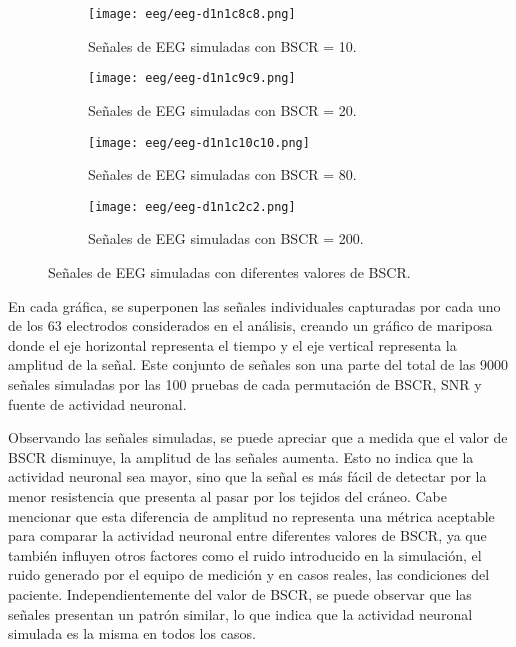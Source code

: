 \begin{figure}[tbp]
    \centering
    \begin{subfigure}{0.9\textwidth}
        \texttt{[image: eeg/eeg-d1n1c8c8.png]}
        \caption{Señales de EEG simuladas con BSCR = 10.}
        \label{fig:eeg-d1n1c8c8}
        \vspace{0.5em}
    \end{subfigure}
    \vfill
    \begin{subfigure}{0.9\textwidth}
        \texttt{[image: eeg/eeg-d1n1c9c9.png]}
        \caption{Señales de EEG simuladas con BSCR = 20.}
        \label{fig:eeg-d1n1c9c9}
        \vspace{0.5em}
    \end{subfigure}
    \vfill
    \begin{subfigure}{0.9\textwidth}
        \texttt{[image: eeg/eeg-d1n1c10c10.png]}
        \caption{Señales de EEG simuladas con BSCR = 80.}
        \label{fig:eeg-d1n1c10c10}
        \vspace{0.5em}
    \end{subfigure}
    \vfill
    \begin{subfigure}{0.9\textwidth}
        \texttt{[image: eeg/eeg-d1n1c2c2.png]}
        \caption{Señales de EEG simuladas con BSCR = 200.}
        \label{fig:eeg-d1n1c2c2}
    \end{subfigure}
    \caption{Señales de EEG simuladas con diferentes valores de BSCR.}
    \label{fig:eeg-simulated}
\end{figure}

En cada gráfica, se superponen las señales individuales capturadas por cada uno de los 63 electrodos considerados en el análisis, creando un gráfico de mariposa donde el eje horizontal representa el tiempo y el eje vertical representa la amplitud de la señal. 
Este conjunto de señales son una parte del total de las 9000 señales simuladas por las 100 pruebas de cada permutación de BSCR, SNR y fuente de actividad neuronal.

Observando las señales simuladas, se puede apreciar que a medida que el valor de BSCR disminuye, la amplitud de las señales aumenta. 
Esto no indica que la actividad neuronal sea mayor, sino que la señal es más fácil de detectar por la menor resistencia que presenta al pasar por los tejidos del cráneo.
Cabe mencionar que esta diferencia de amplitud no representa una métrica aceptable para comparar la actividad neuronal entre diferentes valores de BSCR, ya que también influyen otros factores como el ruido introducido en la simulación, el ruido generado por el equipo de medición y en casos reales, las condiciones del paciente.
Independientemente del valor de BSCR, se puede observar que las señales presentan un patrón similar, lo que indica que la actividad neuronal simulada es la misma en todos los casos.

